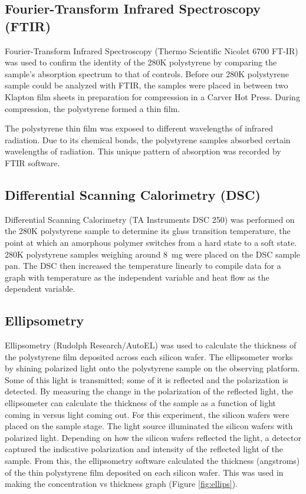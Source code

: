 \documentclass[twocolumn]{article}
\begin{document}
            \subsection{Fourier-Transform Infrared Spectroscopy (FTIR)}
                Fourier-Transform Infrared Spectroscopy (Thermo Scientific Nicolet 6700 FT-IR) was used to confirm the identity of the 280K polystyrene by comparing the sample's absorption spectrum to that of controls. Before our 280K polystyrene sample could be analyzed with FTIR, the samples were placed in between two Klapton film sheets in preparation for compression in a Carver Hot Press. During compression, the polystyrene formed a thin film. 

                The polystyrene thin film was exposed to different wavelengths of infrared radiation. Due to its chemical bonds, the polystyrene samples absorbed certain wavelengths of radiation. This unique pattern of absorption was recorded by FTIR software.

            \subsection{Differential Scanning Calorimetry (DSC)}
                Differential Scanning Calorimetry  (TA Instruments DSC 250) was performed on the 280K polystyrene sample to determine its glass transition temperature, the point at which an amorphous polymer switches from a hard state to a soft state. 280K polystyrene samples weighing around \qty{8}{\milli\gram} were placed on the DSC sample pan. The DSC then increased the temperature linearly to compile data for a graph with temperature as the independent variable and heat flow as the dependent variable.

            \subsection{Ellipsometry}
                Ellipsometry (Rudolph Research/AutoEL) was used to calculate the thickness of the polystyrene film deposited across each silicon wafer. The ellipsometer works by shining polarized light onto the polystyrene sample on the observing platform. Some of this light is transmitted; some of it is reflected and the polarization is detected. By measuring the change in the polarization of the reflected light, the ellipsometer can calculate the thickness of the sample as a function of light coming in versus light coming out. For this experiment, the silicon wafers were placed on the sample stage. The light source illuminated the silicon wafers with polarized light. Depending on how the silicon wafers reflected the light, a detector captured the indicative polarization and intensity of the reflected light of the sample. From this, the ellipsometry software calculated the thickness (angstroms) of the thin polystyrene film deposited on each silicon wafer. This was used in making the concentration vs thickness graph (Figure \ref{fig:ellips}).
\end{document}

